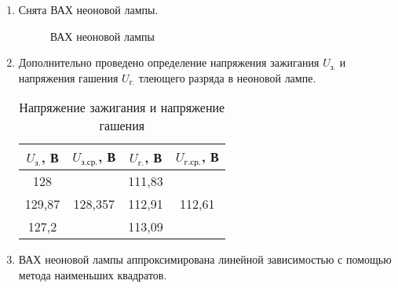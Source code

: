 \documentclass[a4paper, usenames, dvipsnames]{article}
\begin{document}
\begin{enumerate}
    \item Снята ВАХ неоновой лампы.
          \begin{figure}[h]
              \centering
              \caption{ВАХ неоновой лампы}
              \label{ВАХ неоновой лампы}
          \end{figure}
    \item Дополнительно проведено определение напряжения зажигания $U_\text{з.}$
          и напряжения гашения $U_\text{г.}$ тлеющего разряда в неоновой лампе.
          \begin{table}[h]
              \centering
              \begin{tabular}{|c|c|c|c|}
                  \hline
                  $U_\text{з.}$, В & $U_\text{з.ср.}$, В & $U_\text{г.}$, В & $U_\text{г.ср.}$, В \\
                  \hline
                  128              &                     & 111,83           &                     \\
                  \cline{1-1}\cline{3-3}
                  129,87           & 128,357             & 112,91           & 112,61              \\
                  \cline{1-1}\cline{3-3}
                  127,2            &                     & 113,09           &                     \\
                  \hline
              \end{tabular}
              \caption{Напряжение зажигания и напряжение гашения}
              \label{Напряжение зажигания и напряжение гашения}
          \end{table}
    \item ВАХ неоновой лампы аппроксимирована линейной зависимостью с помощью метода наименьших квадратов.

\end{enumerate}
\end{document}
